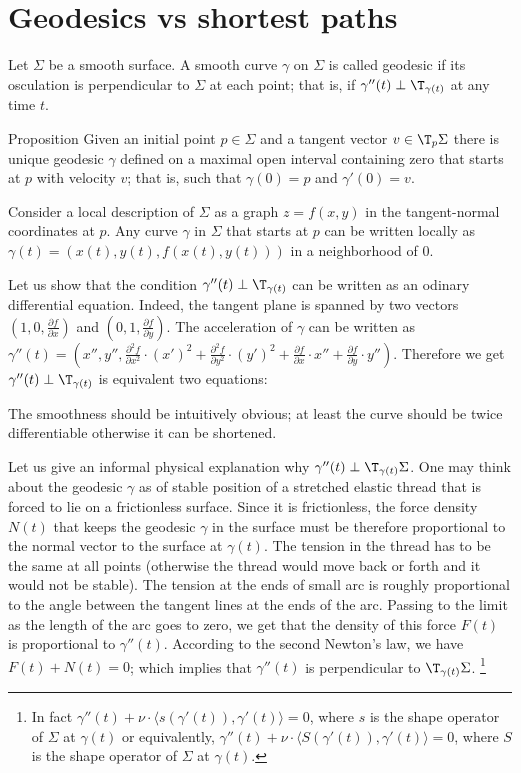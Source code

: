 \chapter{Geodesics vs shortest paths}

Let $\Sigma$ be a smooth surface.
A smooth curve $\gamma$ on $\Sigma$ is called geodesic if its osculation is perpendicular to $\Sigma$ at each point;
that is, if $\gamma''(t)\perp\T_{\gamma(t)}$ at any time $t$.

\begin{thm}{Proposition}
Given an initial point $p\in \Sigma$ and a tangent vector $v\in\T_p\Sigma$ there is unique geodesic $\gamma$ defined on a maximal open interval containing zero that starts at $p$ with velocity $v$; that is,
such that $\gamma(0)=p$ and $\gamma'(0)=v$.
\end{thm}

Consider a local description of $\Sigma$ as a graph $z=f(x,y)$ in the tangent-normal coordinates at $p$.
Any curve $\gamma$ in $\Sigma$ that starts at $p$ can be written locally as 
$\gamma(t)=(x(t),y(t),f(x(t),y(t)))$ in a neighborhood of $0$.

Let us show that the condition $\gamma''(t)\perp\T_{\gamma(t)}$ can be written as an odinary differential equation.
Indeed, the tangent plane is spanned by two vectors $(1,0,\tfrac{\partial f}{\partial x})$ and $(0,1,\tfrac{\partial f}{\partial y})$.
The acceleration of $\gamma$ can be written as $\gamma''(t)=(x'',y'',\tfrac{\partial^2 f}{\partial x^2}\cdot (x')^2+\tfrac{\partial^2 f}{\partial y^2}\cdot (y')^2+\tfrac{\partial f}{\partial x}\cdot x''+\tfrac{\partial f}{\partial y}\cdot y'')$.
Therefore we get $\gamma''(t)\perp\T_{\gamma(t)}$ is equivalent two equations:




The smoothness should be intuitively obvious; at least the curve should be twice differentiable otherwise it can be shortened.

Let us give an informal physical explanation why $\gamma''(t)\perp\T_{\gamma(t)}\Sigma$.
One may think about the geodesic $\gamma$ as of stable position of a stretched elastic thread that is forced to lie on a frictionless surface.
Since it is frictionless, the force density $N(t)$ that keeps the geodesic $\gamma$ in the surface must be therefore proportional to the normal vector to the surface at $\gamma(t)$.
The tension in the thread has to be the same at all points (otherwise the thread would move back or forth and it would not be stable).
The tension at the ends of small arc is roughly proportional to the angle between the tangent lines at the ends of the arc. 
Passing to the limit as the length of the arc goes to zero, we get that the density of this force $F(t)$ is proportional to $\gamma''(t)$.
According to the second Newton's law, we have $F(t)+N(t)=0$;
which implies that  $\gamma''(t)$ is perpendicular to $\T_{\gamma(t)}\Sigma$.%
\footnote{In fact $\gamma''(t)+\nu\cdot \langle s(\gamma'(t)),\gamma'(t)\rangle=0$, where $s$ is the shape operator of $\Sigma$ at $\gamma(t)$ or equivalently,
$\gamma''(t)+\nu\cdot  \langle S(\gamma'(t)),\gamma'(t)\rangle=0$, where $S$ is the shape operator of $\Sigma$ at $\gamma(t)$.}

